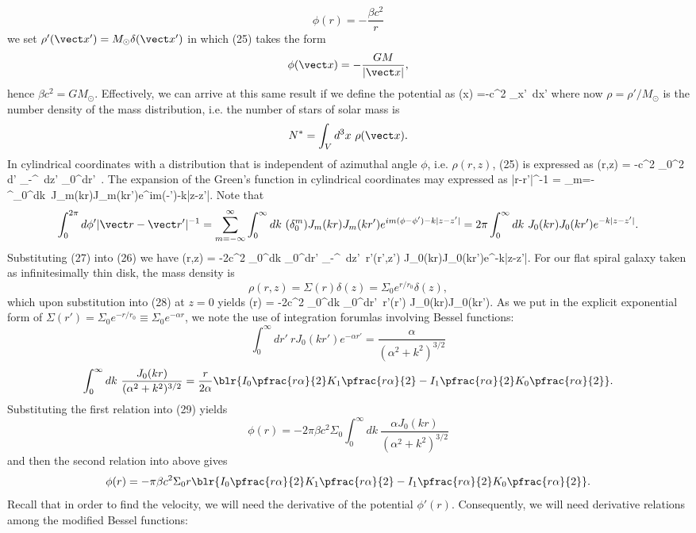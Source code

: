 \documentclass[10pt,letterpaper]{article}
\begin{document}
\[
	\phi(r) = -\frac{\beta c^2}{r}
\]
we set $\rho'(\vect x') = M_\odot \delta(\vect x')$ in which (25) takes the form
\[
	\phi(\vect x) = -\frac{GM}{|\vect x|},
\]
hence $\beta c^2 = GM_\odot$. Effectively, we can arrive at this same result if we define the potential as
\be
	\phi(\vect x) =-\beta c^2 \int_{\vect x'}\ d\vect x'
\ee
where now $\rho = \rho'/M_\odot$ is the number density of the mass distribution, i.e. the number of stars of solar mass is
\[
	N^* = \int_V d^3x\ \rho(\vect x).
\]
In cylindrical coordinates with a distribution that is independent of azimuthal angle $\phi$, i.e. $\rho(r,z)$, (25) is expressed as
\be
	\phi(r,z) = -\beta c^2 \int_0^{2\pi} d\phi' \int_{-\infty}^\infty\ dz' \int_0^\infty dr'\ .
\ee
The expansion of the Green's function in cylindrical coordinates may expressed as
\be
	|\vect r-\vect r'|^{-1} = \sum_{m=-\infty}^\infty \int_0^\infty dk\ J_m(kr)J_m(kr')e^{im(\phi-\phi')-k|z-z'|}.
\ee
Note that 
\[
	\int_0^{2\pi} d\phi' |\vect r-\vect r'|^{-1} =  \sum_{m=-\infty}^\infty \int_0^\infty dk\ (\delta^m_0)J_m(kr)J_m(kr')e^{im(\phi-\phi')-k|z-z'|}
	= 2\pi \int_0^\infty dk\ J_0(kr)J_0(kr')e^{-k|z-z'|}.
\]
Substituting (27) into (26) we have
\be
	\phi(r,z) =   -2\pi\beta c^2 \int_0^\infty dk \int_0^\infty dr' \int_{-\infty}^\infty\ dz'\  r'\rho(r',z') J_0(kr)J_0(kr')e^{-k|z-z'|}.
\ee
For our flat spiral galaxy taken as infinitesimally thin disk, the mass density is 
\[
	\rho(r,z) = \Sigma(r)\delta(z)=\Sigma_0 e^{r/r_0}\delta(z),
\]
which upon substitution into (28) at $z=0$ yields
\be
	\phi(r) =   -2\pi\beta c^2 \int_0^\infty dk \int_0^\infty dr'\  r'\Sigma(r') J_0(kr)J_0(kr').
\ee
As we put in the explicit exponential form of $\Sigma(r') = \Sigma_0 e^{-r/r_0} \equiv \Sigma_0 e^{-\alpha r}$, we note the use of integration forumlas involving Bessel functions:
\[
	\int_0^\infty dr'\ rJ_0(kr')e^{-\alpha r'} = \frac{\alpha}{(\alpha^2+k^2)^{3/2}}
\]
\[
	\int_0^\infty dk\ \frac{J_0(kr)}{(\alpha^2+k^2)^{3/2}} = \frac{r}{2\alpha}\blr{
	I_0\pfrac{r\alpha}{2}K_1\pfrac{r\alpha}{2}-I_1\pfrac{r\alpha}{2}K_0\pfrac{r\alpha}{2}}.
\]
Substituting the first relation into (29) yields
\[
	\phi(r)=-2\pi\beta c^2\Sigma_0 \int_0^\infty dk\ \frac{\alpha J_0(kr)}{(\alpha^2+k^2)^{3/2}}
\]
and then the second relation into above gives
\[
		\phi(r)=-\pi\beta c^2\Sigma_0 r\blr{
	I_0\pfrac{r\alpha}{2}K_1\pfrac{r\alpha}{2}-I_1\pfrac{r\alpha}{2}K_0\pfrac{r\alpha}{2}}.
\]
Recall that in order to find the velocity, we will need the derivative of the potential $\phi'(r)$. Consequently, we will need derivative relations among the modified Bessel functions:
\end{document}
